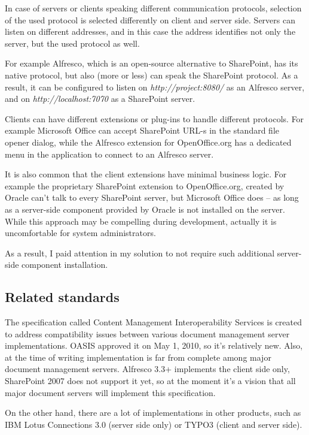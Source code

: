 In case of servers or clients speaking different communication protocols,
selection of the used protocol is selected differently on client and server
side. Servers can listen on different addresses, and in this case the address
identifies not only the server, but the used protocol as well.

For example Alfresco\cite{alfresco}, which is an open-source alternative to
SharePoint, has its native protocol, but also (more or less) can speak the
SharePoint protocol. As a result, it can be configured to listen on
\emph{http://project:8080/} as an Alfresco server, and on
\emph{http://localhost:7070} as a SharePoint server.

Clients can have different extensions or plug-ins to handle different
protocols. For example Microsoft Office can accept SharePoint URL-s in the
standard file opener dialog, while the Alfresco extension for OpenOffice.org
has a dedicated menu in the application to connect to an Alfresco server.

It is also common that the client extensions have minimal business logic. For
example the proprietary SharePoint extension to OpenOffice.org, created by
Oracle can't talk to every SharePoint server, but Microsoft Office does -- as
long as a server-side component provided by Oracle is not installed on the
server. While this approach may be compelling during development, actually it
is uncomfortable for system administrators.

As a result, I paid attention in my solution to not require such additional
server-side component installation.

\subsection{Related standards}

The specification called Content Management Interoperability
Services\cite{cmis} is created to address compatibility issues between various
document management server implementations. OASIS approved it on May 1, 2010,
so it's relatively new. Also, at the time of writing implementation is far from
complete among major document management servers. Alfresco 3.3+ implements the
client side only, SharePoint 2007 does not support it yet, so at the moment
it's a vision that all major document servers will implement this
specification.

On the other hand, there are a lot of implementations in other products, such
as IBM Lotus Connections 3.0\cite{lotus} (server side only) or TYPO3 (client
and server side).

